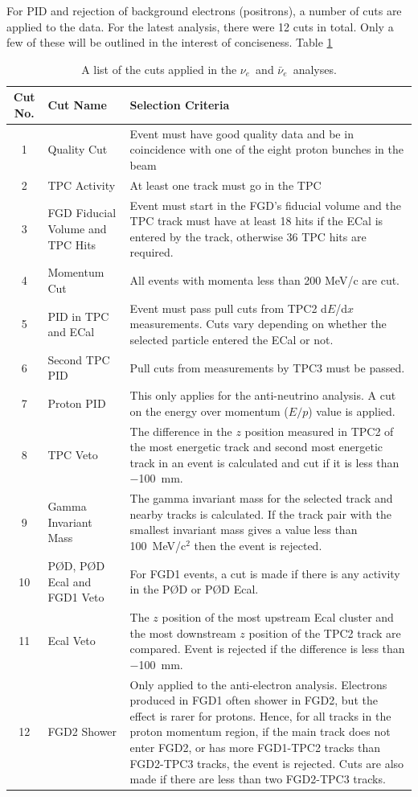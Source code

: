 \documentclass[aps,pra,12pt,notitlepage,tightenlines]{revtex4-1}
\newcommand{\nue}{$\nu_e$}
\newcommand{\anue}{$\bar\nu_e$}
\begin{document}
For PID and rejection of background electrons (positrons), a number of cuts are applied to the data. For the latest analysis, there were 12 cuts in total. Only a few of these will be outlined in the interest of conciseness. Table \ref{tab:cuts} 
\begin{table}
 \begin{tabular}{|c|m{5cm}|m{9cm}|}
  \hline
  Cut No. & Cut Name & Selection Criteria \\
  \hline\hline
  1 & Quality Cut & Event must have good quality data and be in coincidence with one of the eight proton bunches in the beam\\
  \hline
  2 & TPC Activity & At least one track must go in the TPC \\
  \hline
  3 & FGD Fiducial Volume and TPC Hits & Event must start in the FGD's fiducial volume and the TPC track must have at least 18 hits if the ECal is entered by the track, otherwise 36 TPC hits are required.  \\
  \hline
  4 & Momentum Cut & All events with momenta less than 200 MeV/c are cut. \\
  \hline
  5 & PID in TPC and ECal & Event must pass pull cuts from TPC2 d$E$/d$x$ measurements. Cuts vary depending on whether the selected particle entered the ECal or not. \\
  \hline
  6 & Second TPC PID & Pull cuts from measurements by TPC3 must be passed. \\
  \hline 
  7 & Proton PID & This only applies for the anti-neutrino analysis. A cut on the energy over momentum ($E/p$) value is applied. \\
  \hline
  8 & TPC Veto & The difference in the $z$ position measured in TPC2 of the most energetic track and second most energetic track in an event is calculated and cut if it is less than $-$100~mm. \\
  \hline
  9 & Gamma Invariant Mass & The gamma invariant mass for the selected track and nearby tracks is calculated. If the track pair with the smallest invariant mass gives a value less than 100~MeV/c$^2$ then the event is rejected. \\
  \hline
  10 & P\O D, P\O D Ecal and FGD1 Veto & For FGD1 events, a cut is made if there is any activity in the P\O D or P\O D Ecal.\\
  \hline
  11 & Ecal Veto & The $z$ position of the most upstream Ecal cluster and the most downstream $z$ position of the TPC2 track are compared. Event is rejected if the difference is less than $-$100~mm. \\
  \hline
  12 & FGD2 Shower & Only applied to the anti-electron analysis. Electrons produced in FGD1 often shower in FGD2, but the effect is rarer for protons. Hence, for all tracks in the proton momentum region, if the main track does not enter FGD2, or has more FGD1-TPC2 tracks than FGD2-TPC3 tracks, the event is rejected. Cuts are also made if there are less than two FGD2-TPC3 tracks. \\
  \hline 
 \end{tabular}
 \caption{A list of the cuts applied in the \nue \ and \anue \ analyses.}
 \label{tab:cuts}
\end{table}
\end{document}
